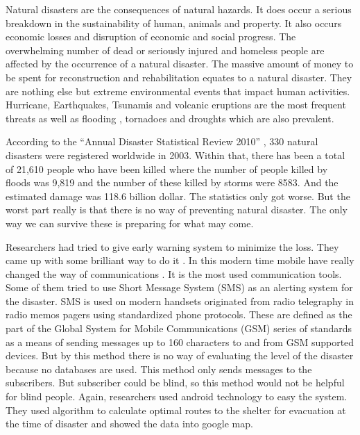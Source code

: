 \documentclass[conference]{IEEEtran}
\begin{document}
Natural disasters are the consequences of natural hazards. It does occur a serious breakdown in the sustainability of  human, animals and property. It also occurs economic losses and disruption of economic and social progress. The overwhelming number of dead or seriously injured and homeless people are affected by the occurrence of a natural disaster. The massive amount of money to be spent for reconstruction and rehabilitation equates to a natural disaster. They are nothing else but extreme environmental events that impact human activities. Hurricane, Earthquakes, Tsunamis and volcanic eruptions are the most frequent threats as well as flooding \cite{khalid2015flood}, tornadoes and droughts which are also prevalent.
    
According to the “Annual Disaster Statistical Review 2010” \cite {guha2011annual}, 330 natural disasters were registered worldwide in 2003. Within that, there has been a total of 21,610 people who have been killed where the number of people killed by floods was 9,819 and the number of these killed by storms were 8583. And the estimated damage was 118.6 billion dollar. The statistics only got worse. But the worst part really is that there is no way of preventing natural disaster. The only way we can survive these is preparing for what may come.
 
Researchers had tried to give early warning system to minimize the loss. They came up with some brilliant way to do it \cite{zimmers2015alert,fajardo2010implementation,lo2015developing}. In this modern time mobile have really changed the way of communications \cite{laird2007mobile,rahman2012location}. It is the most used communication tools. Some of them tried to use Short Message System (SMS)\cite{mahmud2012sms} as an alerting system for the disaster. SMS is used on modern handsets originated from radio telegraphy \cite{turner2013wireless} in radio memos pagers using standardized phone protocols. These are defined as the part of the Global System for Mobile Communications (GSM) series \cite{waidyanatha2007challenges} of standards as a means of sending messages up to 160 characters to and from GSM supported devices. But by this method there is no way of evaluating the level of the disaster because no databases are used. This method only sends messages to the subscribers. But subscriber could be blind, so this method would not be helpful for blind people. Again, researchers used android technology \cite{fajardo2010implementation} to easy the system. They used algorithm to calculate optimal routes to the shelter for evacuation at the time of disaster and showed the data into google map.
\end{document}
